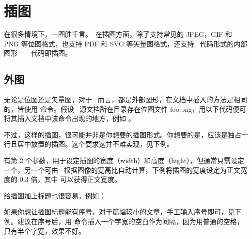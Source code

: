 \chapter{插图}

在很多情境下，一图胜千言。\CONTEXT\ 在插图方面，除了支持常见的 JPEG，GIF 和 PNG 等位图格式，也支持 PDF 和 SVG 等矢量图格式，还支持 \METAPOST\ 代码形式的内部图形——代码即插图。

\section[figure]{外图}

无论是位图还是矢量图，对于 \CONTEXT\ 而言，都是外部图形，在文档中插入的方法是相同的，皆使用  命令。假设 \CONTEXT\ 源文档所在目录存在位图文件 foo.png，用以下代码便可将其插入文档中该命令出现的地方，例如 。

\starttyping[option=TEX]
\stoptyping

不过，这样的插图，很可能并非是你想要的插图形式。你想要的是，应该是独占一行且居中放置的插图。这个要求这并不难实现，见下例。

\startTEX
{}
\stopTEX
\blank[line]
\blank[halfline]

 有第 2 个参数，用于设定插图的宽度（width）和高度（hight），但通常只需设定一个，另一个可由 \CONTEXT\ 根据图像的宽高比自动计算，下例将插图的宽度设定为正文宽度的 0.3 倍，其中  可以获得正文宽度。

\startTEX
{}
\stopTEX
\blank[line]
\blank[halfline]

给插图加上标题也很容易，例如：

\startTEX
{}
\stopTEX
\blank[line]

如果你想让插图标题能有序号，对于篇幅较小的文章，手工输入序号即可，见下例。建议在序号后，用  命令插入一个字宽的空白作为间隔，因为用普通的空格，只有半个字宽，效果不好。

\startTEX
{}
\stopTEX
\blank[line]

